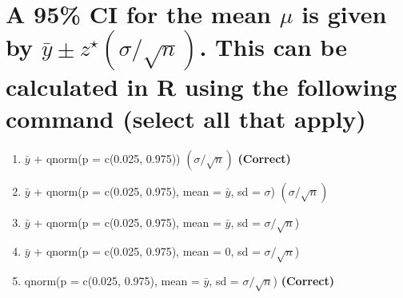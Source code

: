 \documentclass[letterpaper,10pt,twoside,printwatermark=false]{pinp}
\providecommand{\tightlist}{%
  \setlength{\itemsep}{0pt}\setlength{\parskip}{0pt}}
\begin{document}
\section{\texorpdfstring{A 95\% CI for the mean \(\mu\) is given by
\(\bar{y} \pm z^\star (\sigma / \sqrt{n})\). This can be calculated in R
using the following command (select all that
apply)}{A 95\% CI for the mean \textbackslash{}mu is given by \textbackslash{}bar\{y\} \textbackslash{}pm z\^{}\textbackslash{}star (\textbackslash{}sigma / \textbackslash{}sqrt\{n\}). This can be calculated in R using the following command (select all that apply)}}\label{a-95-ci-for-the-mean-mu-is-given-by-bary-pm-zstar-sigma-sqrtn.-this-can-be-calculated-in-r-using-the-following-command-select-all-that-apply}

\begin{enumerate}
\def\labelenumi{\arabic{enumi}.}
\tightlist
\item
  \(\bar{y}\) + qnorm(p = c(0.025, 0.975)) \((\sigma / \sqrt{n})\)
  \textbf{(Correct)}
\item
  \(\bar{y}\) + qnorm(p = c(0.025, 0.975), mean = \(\bar{y}\), sd =
  \(\sigma\)) \((\sigma / \sqrt{n})\)
\item
  \(\bar{y}\) + qnorm(p = c(0.025, 0.975), mean = \(\bar{y}\), sd =
  \(\sigma / \sqrt{n}\))
\item
  \(\bar{y}\) + qnorm(p = c(0.025, 0.975), mean = 0, sd =
  \(\sigma / \sqrt{n}\))
\item
  qnorm(p = c(0.025, 0.975), mean = \(\bar{y}\), sd =
  \(\sigma / \sqrt{n}\)) \textbf{(Correct)}
\end{enumerate}





\end{document}
